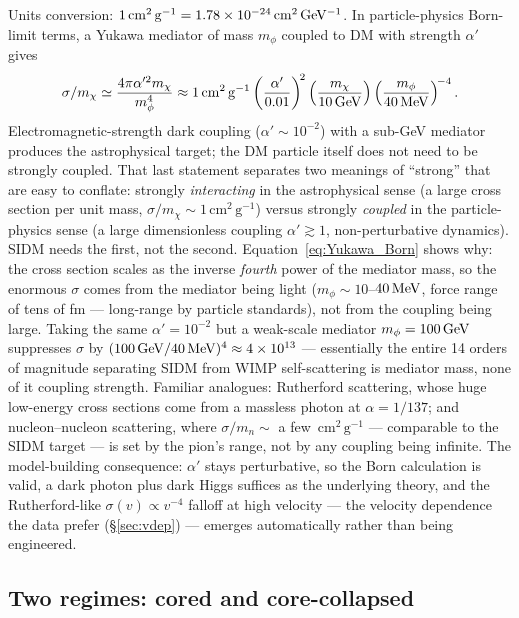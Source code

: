 \documentclass[12pt]{article}
\newcommand{\cmg}{\,\mathrm{cm^2\,g^{-1}}}
\newcommand{\smx}{\sigma/m_\chi}
\begin{document}
Units conversion:
$1\cmg = 1.78\times 10^{-24}\,{\rm cm^2\,GeV^{-1}}$.  In particle-physics
Born-limit terms, a Yukawa mediator of mass $m_\phi$ coupled to DM
with strength $\alpha'$ gives
%
\begin{equation}
  \smx \simeq \frac{4\pi\alpha'^2 m_\chi}{m_\phi^4}
    \approx 1\cmg
      \left(\frac{\alpha'}{0.01}\right)^{\!2}
      \left(\frac{m_\chi}{10\,{\rm GeV}}\right)
      \left(\frac{m_\phi}{40\,{\rm MeV}}\right)^{\!-4}.
  \label{eq:Yukawa_Born}
\end{equation}
%
Electromagnetic-strength dark coupling ($\alpha' \sim 10^{-2}$) with a
sub-GeV mediator produces the astrophysical target; the DM particle
itself does not need to be strongly coupled.  That last statement
separates two meanings of ``strong'' that are easy to conflate:
strongly \emph{interacting} in the astrophysical sense (a large cross
section per unit mass, $\smx\sim 1\cmg$) versus strongly
\emph{coupled} in the particle-physics sense (a large dimensionless
coupling $\alpha'\gtrsim 1$, non-perturbative dynamics).  SIDM needs
the first, not the second.  Equation~\eqref{eq:Yukawa_Born} shows
why: the cross section scales as the inverse \emph{fourth} power of
the mediator mass, so the enormous $\sigma$ comes from the mediator
being light ($m_\phi\sim 10$--$40\,{\rm MeV}$, force range of tens of
fm --- long-range by particle standards), not from the coupling being
large.  Taking the same $\alpha' = 10^{-2}$ but a weak-scale mediator
$m_\phi = 100\,{\rm GeV}$ suppresses $\sigma$ by
$(100\,{\rm GeV}/40\,{\rm MeV})^4 \approx 4\times 10^{13}$ ---
essentially the entire 14 orders of magnitude separating SIDM from
WIMP self-scattering is mediator mass, none of it coupling strength.
Familiar analogues: Rutherford scattering, whose huge low-energy
cross sections come from a massless photon at $\alpha = 1/137$; and
nucleon--nucleon scattering, where $\sigma/m_n \sim$ a few $\cmg$
--- comparable to the SIDM target --- is set by the pion's range, not
by any coupling being infinite.  The model-building consequence:
$\alpha'$ stays perturbative, so the Born calculation is valid, a
dark photon plus dark Higgs suffices as the underlying theory, and
the Rutherford-like $\sigma(v)\propto v^{-4}$ falloff at high
velocity --- the velocity dependence the data prefer
(\S\ref{sec:vdep}) --- emerges automatically rather than being
engineered.

\subsection{Two regimes: cored and core-collapsed}
\label{sec:regimes}
\end{document}
